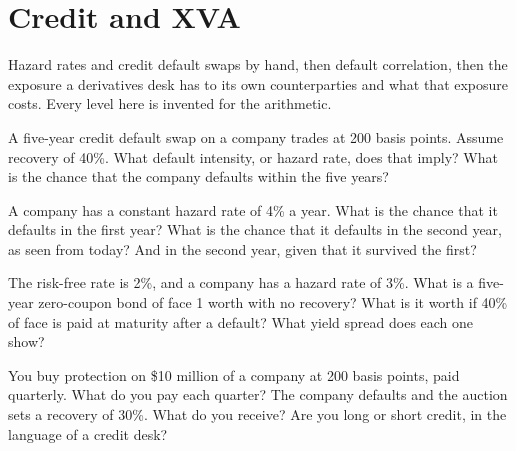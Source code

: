 \chapter{Credit and XVA}\label{ch:iv2:credit-and-xva}

\begin{ivtrains}
Hazard rates and credit default swaps by hand, then default correlation, then the exposure a derivatives desk has to its own counterparties and what that exposure costs. Every level here is invented for the arithmetic.
\end{ivtrains}

\begin{question}\label{iq:iv2:credit-and-xva:1}
A five-year credit default swap on a company trades at 200 basis points. Assume recovery of 40\%. What default intensity, or hazard rate, does that imply? What is the chance that the company defaults within the five years?
\end{question}

\begin{question}\label{iq:iv2:credit-and-xva:2}
A company has a constant hazard rate of 4\% a year. What is the chance that it defaults in the first year? What is the chance that it defaults in the second year, as seen from today? And in the second year, given that it survived the first?
\end{question}

\begin{question}\label{iq:iv2:credit-and-xva:3}
The risk-free rate is 2\%, and a company has a hazard rate of 3\%. What is a five-year zero-coupon bond of face 1 worth with no recovery? What is it worth if 40\% of face is paid at maturity after a default? What yield spread does each one show?
\end{question}

\begin{question}\label{iq:iv2:credit-and-xva:4}
You buy protection on \$10 million of a company at 200 basis points, paid quarterly. What do you pay each quarter? The company defaults and the auction sets a recovery of 30\%. What do you receive? Are you long or short credit, in the language of a credit desk?
\end{question}

